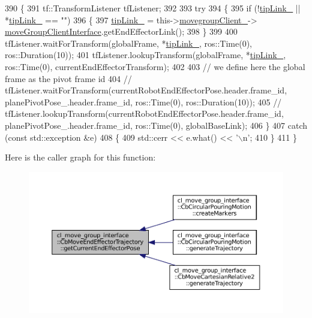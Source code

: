 \begin{DoxyCode}
390     \{
391         tf::TransformListener tfListener;
392 
393         \textcolor{keywordflow}{try}
394         \{
395             \textcolor{keywordflow}{if} (!\hyperlink{classcl__move__group__interface_1_1CbMoveEndEffectorTrajectory_a24c6c30b9b0761a61fa002d947bd3e11}{tipLink\_} || *\hyperlink{classcl__move__group__interface_1_1CbMoveEndEffectorTrajectory_a24c6c30b9b0761a61fa002d947bd3e11}{tipLink\_} == \textcolor{stringliteral}{""})
396             \{
397                 \hyperlink{classcl__move__group__interface_1_1CbMoveEndEffectorTrajectory_a24c6c30b9b0761a61fa002d947bd3e11}{tipLink\_} = this->\hyperlink{classcl__move__group__interface_1_1CbMoveEndEffectorTrajectory_aea650d3e7836125b32be97392b71a7f3}{movegroupClient\_}->
      \hyperlink{classcl__move__group__interface_1_1ClMoveGroup_a92922ea689e4e1b7b91512c56629c95b}{moveGroupClientInterface}.getEndEffectorLink();
398             \}
399 
400             tfListener.waitForTransform(globalFrame, *\hyperlink{classcl__move__group__interface_1_1CbMoveEndEffectorTrajectory_a24c6c30b9b0761a61fa002d947bd3e11}{tipLink\_}, ros::Time(0), ros::Duration(10));
401             tfListener.lookupTransform(globalFrame, *\hyperlink{classcl__move__group__interface_1_1CbMoveEndEffectorTrajectory_a24c6c30b9b0761a61fa002d947bd3e11}{tipLink\_}, ros::Time(0), 
      currentEndEffectorTransform);
402 
403             \textcolor{comment}{// we define here the global frame as the pivot frame id}
404             \textcolor{comment}{// tfListener.waitForTransform(currentRobotEndEffectorPose.header.frame\_id,
       planePivotPose\_.header.frame\_id, ros::Time(0), ros::Duration(10));}
405             \textcolor{comment}{// tfListener.lookupTransform(currentRobotEndEffectorPose.header.frame\_id,
       planePivotPose\_.header.frame\_id, ros::Time(0), globalBaseLink);}
406         \}
407         \textcolor{keywordflow}{catch} (\textcolor{keyword}{const} std::exception &e)
408         \{
409             std::cerr << e.what() << \textcolor{charliteral}{'\(\backslash\)n'};
410         \}
411     \}
\end{DoxyCode}
Here is the caller graph for this function\+:
\nopagebreak
\begin{figure}[H]
\begin{center}
\leavevmode
\includegraphics[width=350pt]{classcl__move__group__interface_1_1CbMoveEndEffectorTrajectory_a56945ccfff51e3eb9ec9c2edcfa132af_icgraph}
\end{center}
\end{figure}
